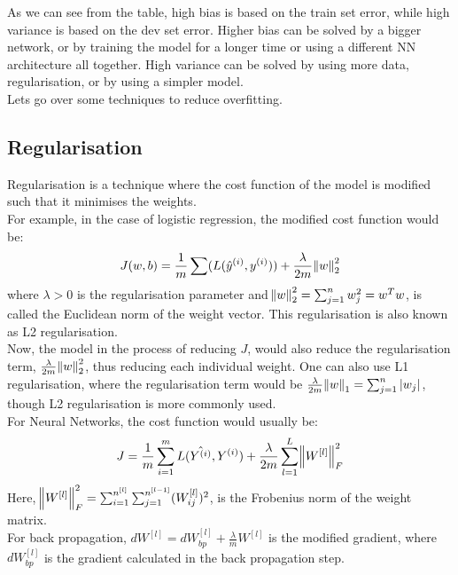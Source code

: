 \documentclass[12pt]{article}
\begin{document}
As we can see from the table, high bias is based on the train set error, while high variance is based on the dev set error. Higher bias can be solved by a bigger network, or by training the model for a longer time or using a different NN architecture all together. High variance can be solved by using more data, regularisation, or by using a simpler model.\\
Lets go over some techniques to reduce overfitting.
\subsection{Regularisation}
Regularisation is a technique where the cost function of the model is modified such that it minimises the weights. \\
For example, in the case of logistic regression, the modified cost function would be:
\begin{equation}
    J(w,b) = \frac{1}{m} \sum(L(\hat{y}^{(i)},y^{(i)})) + \frac{\lambda}{2m} \norm{w}^2_2
\end{equation}
where $\lambda > 0$ is the regularisation parameter and $\norm{w}^2_2 = \sum_{j=1}^{n} w_j^2 = w^Tw$, is called the Euclidean norm of the weight vector. This regularisation is also known as L2 regularisation.\\
Now, the model in the process of reducing $J$, would also reduce the  regularisation term, $\frac{\lambda}{2m} \norm{w}^2_2$, thus reducing each individual weight. 
One can also use L1 regularisation, where the regularisation term would be $\frac{\lambda}{2m} \norm{w}_1 = \sum_{j=1}^{n} |w_j|$, though L2 regularisation is more commonly used.\\
For Neural Networks, the cost function would usually be:
\begin{equation}
    J = \frac{1}{m} \sum_{i=1}^{m} L(\hat{Y^{(i)}},Y^{(i)}) + \frac{\lambda}{2m} \sum_{l=1}^{L} \norm{W^{[l]}}^2_F
\end{equation} 
Here, $\norm{W^{[l]}}^2_F = \sum_{i=1}^{n^{[l]}} \sum_{j=1}^{n^{[l-1]}} (W^{[l]}_{ij})^2$, is the Frobenius norm of the weight matrix.\\
For back propagation, $dW^{[l]}=dW^{[l]}_{bp} + \frac{\lambda}{m} W^{[l]}$ is the modified gradient, where $dW^{[l]}_{bp}$ is the gradient calculated in the back propagation step.\\
\end{document}
